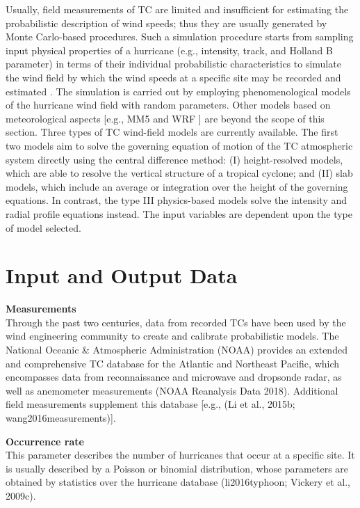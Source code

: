 Usually, field measurements of TC are limited and insufficient for estimating the probabilistic description of wind speeds; thus they are usually generated by Monte Carlo-based procedures. Such a simulation procedure starts from sampling input physical properties of a hurricane (e.g., intensity, track, and Holland B parameter) in terms of their individual probabilistic characteristics to simulate the wind field by which the wind speeds at a specific site may be recorded and estimated \citep{russell1969probability}. The simulation is carried out by employing phenomenological models of the hurricane wind field with random parameters. Other models based on meteorological aspects [e.g., MM5 \citep{liu1997multiscale} and WRF \citep{davis2008prediction}] are beyond the scope of this section. Three types of TC wind-field models are currently available. The first two models aim to solve the governing equation of motion of the TC atmospheric system directly using the central difference method: (I) height-resolved models, which are able to resolve the vertical structure of a tropical cyclone; and (II) slab models, which include an average or integration over the height of the governing equations. In contrast, the type III physics-based models solve the intensity and radial profile equations instead. The input variables are dependent upon the type of model selected.

\section{Input and Output Data}
\label{sec:storm_wind_io}

\noindent\textbf{Measurements} \\Through the past two centuries, data from recorded TCs have been used by the wind engineering community to create and calibrate probabilistic models. The National Oceanic \& Atmospheric Administration (NOAA) provides an extended and comprehensive TC database for the Atlantic and Northeast Pacific, which encompasses data from reconnaissance and microwave and dropsonde radar, as well as anemometer measurements (NOAA Reanalysis Data 2018). Additional field measurements supplement this database [e.g., (Li et al., 2015b; wang2016measurements)].
\newline

\noindent\textbf{Occurrence rate} \\This parameter describes the number of hurricanes that occur at a specific site. It is usually described by a Poisson or binomial distribution, whose parameters are obtained by statistics over the hurricane database (li2016typhoon; Vickery et al., 2009c).
\newline

